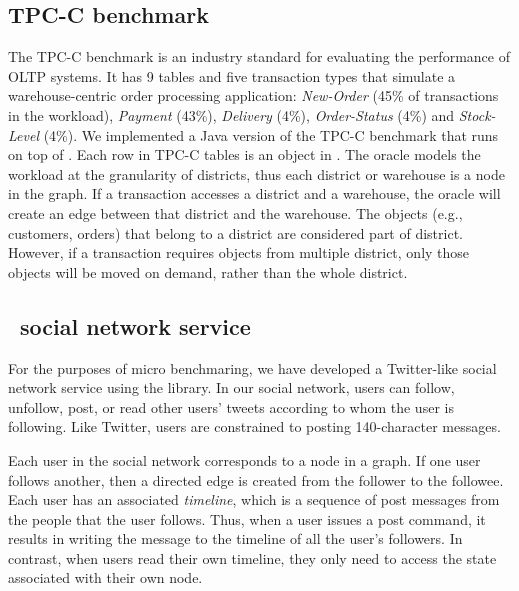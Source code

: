\subsection{TPC-C benchmark}
\label{sec:imp:tpcc}


The TPC-C benchmark is an industry standard for evaluating the performance of OLTP systems.
It has 9 tables and five transaction types that simulate a warehouse-centric 
order processing application: \emph{New-Order} (45\% of transactions in the workload), \emph{Payment} (43\%), \emph{Delivery}
(4\%), \emph{Order-Status} (4\%) and \emph{Stock-Level} (4\%).
We implemented a Java version of the TPC-C benchmark that runs on top of \dynastar. 
Each row in TPC-C tables is an object in \dynastar. The oracle models the workload at the granularity of districts,
thus each district or warehouse is a node in the graph. If a transaction accesses a district 
and a warehouse, the oracle will create an edge between that district and the warehouse.
The objects (e.g., customers, orders) that belong to a district 
are considered part of district. However, if a transaction requires
objects from multiple district, only those objects will be moved on demand, rather than
the whole district.

\subsection{\appname\ social network service}
\label{sec:imp:\appname}

For the purposes of micro benchmaring, we have developed a Twitter-like
social network service using the \dynastar{} library.  In our social
network, users can follow, unfollow, post, or read other users' tweets
according to whom the user is following. Like Twitter, users are
constrained to posting 140-character messages.

Each user in the social network corresponds to a node in a graph. If
one user follows another, then a directed edge is created from the
follower to the followee. Each user has an associated \emph{timeline},
which is a sequence of post messages from the people that the user
follows. Thus, when a user issues a post command, it results in
writing the message to the timeline of all the user's followers.  In
contrast, when users read their own timeline, they only need
to access the state associated with their own node.

